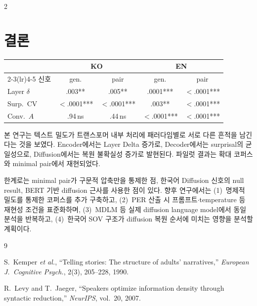\documentclass[10pt,a4paper]{article}
\begin{document}
\begin{multicols}{2}

\section{결론}

\vspace{4pt}
\begin{center}
\label{tab:summary}
\footnotesize
\begin{tabular}{@{}lcccc@{}}
\toprule
 & \multicolumn{2}{c}{KO} & \multicolumn{2}{c}{EN} \\
\cmidrule(lr){2-3}\cmidrule(lr){4-5}
신호 & gen. & pair & gen. & pair \\
\midrule
Layer $\delta$  & .003** & .005** & .0001*** & ${<}$.0001*** \\
Surp.\ CV      & ${<}$.0001*** & ${<}$.0001*** & .003** & ${<}$.0001*** \\
Conv.\ $A$     & .94\,ns & .44\,ns & ${<}$.0001*** & ${<}$.0001*** \\
\bottomrule
\end{tabular}
\end{center}
\vspace{4pt}

본 연구는 텍스트 밀도가 트랜스포머 내부 처리에 패러다임별로 서로 다른 흔적을 남긴다는 것을 보였다. Encoder에서는 Layer Delta 증가로, Decoder에서는 surprisal의 균일성으로, Diffusion에서는 복원 불확실성 증가로 발현된다. 파일럿 결과는 확대 코퍼스와 minimal pair에서 재현되었다.

한계로는 minimal pair가 구문적 압축만을 통제한 점, 한국어 Diffusion 신호의 null result, BERT 기반 diffusion 근사를 사용한 점이 있다. 향후 연구에서는 (1)~명제적 밀도를 통제한 코퍼스를 추가 구축하고, (2)~PER 산출 시 프롬프트$\cdot$temperature 등 재현성 조건을 표준화하며, (3)~MDLM\cite{sahoo2024} 등 실제 diffusion language model에서 동일 분석을 반복하고, (4)~한국어 SOV 구조가 diffusion 복원 순서에 미치는 영향을 분석할 계획이다.

\begin{thebibliography}{9}
\footnotesize

S.~Kemper \textit{et al.},
``Telling stories: The structure of adults' narratives,''
\textit{European J.\ Cognitive Psych.}, 2(3), 205--228, 1990.

R.~Levy and T.~Jaeger,
``Speakers optimize information density through syntactic reduction,''
\textit{NeurIPS}, vol.~20, 2007.


\end{thebibliography}
\end{multicols}
\end{document}
